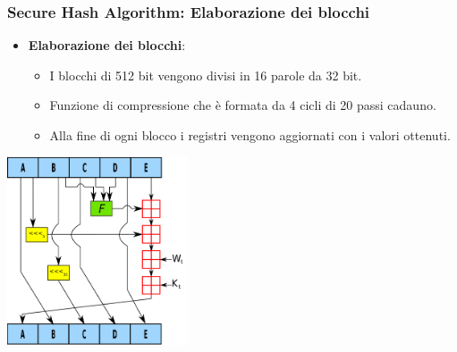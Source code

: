 \begin{frame}
	\frametitle{Secure Hash Algorithm: Elaborazione dei blocchi}
	\begin{itemize}
		\item \textbf{Elaborazione dei blocchi}:
		      \begin{itemize}
			      \item I blocchi di 512 bit vengono divisi in 16 parole da 32 bit.
			      \item Funzione di compressione che è formata da 4 cicli di 20 passi cadauno.
			      \item Alla fine di ogni blocco i registri vengono aggiornati con i valori ottenuti.
		      \end{itemize}
	\end{itemize}

	\begin{center}
		\includegraphics[width=0.4\textwidth]{img/1-img/SHA-1.png}
	\end{center}
\end{frame}